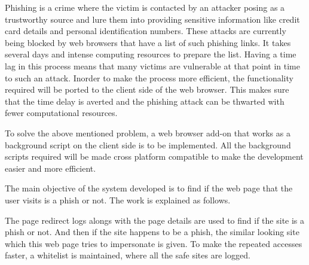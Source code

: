 
\tab Phishing is a crime where the victim is contacted by an attacker posing as a trustworthy source and lure them into providing sensitive information like credit card details and personal identification numbers. These attacks are currently being blocked by web browsers that have a list of such phishing links. It takes several days and intense computing resources to prepare the list. Having a time lag in this process means that many victims are vulnerable at that point in time to such an attack. Inorder to make the process more efficient, the functionality required will be ported to the client side of the web browser. This makes sure that the time delay is averted and the phishing attack can be thwarted with fewer computational resources.

\tab To solve the above mentioned problem, a web browser add-on that works as a background script on the client side is to be implemented. All the background scripts required will be made cross platform compatible to make the development easier and more efficient.

\tab The main objective of the system developed is to find if the web page that the user visits is a phish or not. The work is explained as follows.

\tab The page redirect logs alongs with the page details are used to find if the site is a phish or not. And then if the site happens to be a phish, the similar looking site which this web page tries to impersonate is given. To make the repeated accesses faster, a whitelist is maintained, where all the safe sites are logged.